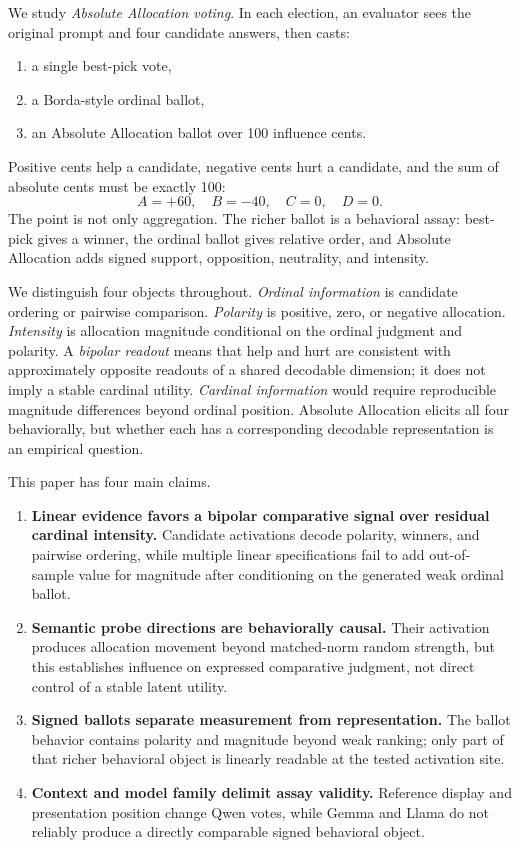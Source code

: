 \documentclass[11pt]{article}
\begin{document}
We study \emph{Absolute Allocation voting}. In each election, an evaluator sees
the original prompt and four candidate answers, then casts:
\begin{enumerate}[noitemsep]
    \item a single best-pick vote,
    \item a Borda-style ordinal ballot,
    \item an Absolute Allocation ballot over 100 influence cents.
\end{enumerate}
Positive cents help a candidate, negative cents hurt a candidate, and the sum
of absolute cents must be exactly 100:
\[
A=+60,\quad B=-40,\quad C=0,\quad D=0.
\]
The point is not only aggregation. The richer ballot is a behavioral assay:
best-pick gives a winner, the ordinal ballot gives relative order, and
Absolute Allocation adds signed support, opposition, neutrality, and intensity.

We distinguish four objects throughout. \emph{Ordinal information} is candidate
ordering or pairwise comparison. \emph{Polarity} is positive, zero, or negative
allocation. \emph{Intensity} is allocation magnitude conditional on the
ordinal judgment and polarity. A \emph{bipolar readout} means that help and
hurt are consistent with approximately opposite readouts of a shared decodable
dimension; it does not imply a stable cardinal utility. \emph{Cardinal
information} would require reproducible magnitude differences beyond ordinal
position. Absolute Allocation elicits all four behaviorally, but whether each
has a corresponding decodable representation is an empirical question.

This paper has four main claims.
\begin{enumerate}[noitemsep]
    \item \textbf{Linear evidence favors a bipolar comparative signal over
    residual cardinal intensity.} Candidate activations decode polarity,
    winners, and pairwise ordering, while multiple linear specifications fail
    to add out-of-sample value for magnitude after conditioning on the generated
    weak ordinal ballot.
    \item \textbf{Semantic probe directions are behaviorally causal.} Their
    activation produces allocation movement beyond matched-norm random
    strength, but this establishes influence on expressed comparative judgment,
    not direct control of a stable latent utility.
    \item \textbf{Signed ballots separate measurement from representation.}
    The ballot behavior contains polarity and magnitude beyond weak ranking;
    only part of that richer behavioral object is linearly readable at the
    tested activation site.
    \item \textbf{Context and model family delimit assay validity.} Reference
    display and presentation position change Qwen votes, while Gemma and Llama
    do not reliably produce a directly comparable signed behavioral object.
\end{enumerate}
\end{document}
